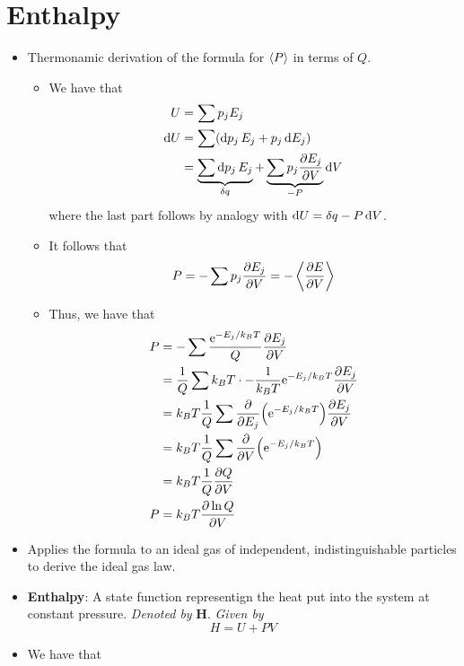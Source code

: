 \documentclass[../notes.tex]{subfiles}
\begin{document}
\section{Enthalpy}
\begin{itemize}
    \item {}Thermonamic derivation of the formula for $\prb{P}$ in terms of $Q$.
    \begin{itemize}
        \item We have that
        \begin{align*}
            U &= \sum p_jE_j\\
            \dd{U} &= \sum(\dd{p_j}E_j+p_j\dd{E_j})\\
            &= \underbrace{\sum\dd{p_j}E_j}_{\var{q}}+\underbrace{\sum p_j\pdv{E_j}{V}}_{-P}\dd{V}
        \end{align*}
        where the last part follows by analogy with $\dd{U}=\var{q}-P\dd{V}$.
        \item It follows that
        \begin{equation*}
            P = -\sum p_j\pdv{E_j}{V} = -\prb{\pdv{E}{V}}
        \end{equation*}
        \item Thus, we have that
        \begin{align*}
            P &= -\sum\frac{\e[-E_j/k_BT]}{Q}\pdv{E_j}{V}\\
            &= \frac{1}{Q}\sum k_BT\cdot-\frac{1}{k_BT}\e[-E_j/k_BT]\pdv{E_j}{V}\\
            &= k_BT\frac{1}{Q}\sum\pdv{E_j}(\e[-E_j/k_BT])\pdv{E_j}{V}\\
            &= k_BT\frac{1}{Q}\sum\pdv{V}(\e[-E_j/k_BT])\\
            &= k_BT\frac{1}{Q}\pdv{Q}{V}\\
            P &= k_BT\pdv{\ln Q}{V}
        \end{align*}
    \end{itemize}
    \item Applies the formula to an ideal gas of independent, indistinguishable particles to derive the ideal gas law.
    \item \textbf{Enthalpy}: A state function representign the heat put into the system at constant pressure. \emph{Denoted by} $\bm{H}$. \emph{Given by}
    \begin{equation*}
        H = U+PV
    \end{equation*}
    \item We have that
    \begin{align*}

\end{align*}
\end{itemize}
\end{document}
